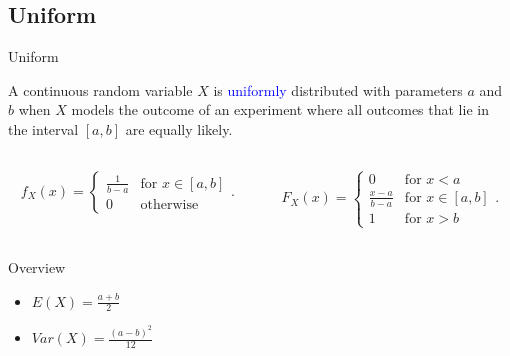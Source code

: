\documentclass{beamer}
\def\padding{\vspace{0.5cm}}
\def\b{\textcolor{blue}}
\begin{document}
\subsection{Uniform}
\begin{frame}{Uniform}
    \begin{definition}
        A continuous random variable $X$ is \b{uniformly} distributed with parameters $a$ and $b$ when $X$ models the outcome of an experiment where all outcomes that lie in the interval $[a,b]$ are equally likely.\pause
        \begin{columns}
            \begin{column}{0.5\textwidth}
               \begin{align*}
                    f_X(x) = \begin{cases}
                        \frac{1}{b - a} & \text{for $x \in [a,b]$} \\
                        0 & \text{otherwise}
                    \end{cases}.
                \end{align*}
            \end{column}\pause
            \begin{column}{0.5\textwidth}
                \begin{align*}
                    F_X(x) = \begin{cases}
                        0 & \text{for $x < a$} \\
                        \frac{x - a}{b - a} & \text{for $x \in [a,b]$} \\
                        1 & \text{for $x > b$}
                    \end{cases}.
                \end{align*}
            \end{column}
        \end{columns}\pause\par\padding
        \begin{exampleblock}{Overview}
            \begin{itemize}
                \item $E(X) = \frac{a + b}{2}$\pause
                \item $Var(X) = \frac{(a - b)^2}{12}$
            \end{itemize}
        \end{exampleblock}
    \end{definition}
\end{frame}
\end{document}
